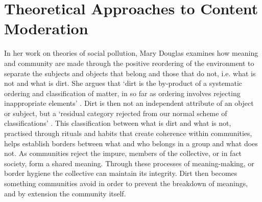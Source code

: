 {\color{red}

\cite{Harway:1988,Gitelman:2013,Gitelman-Jackson:2013,Mohanty:1984}

\section{Theoretical Approaches to Content Moderation} %

In her work on theories of social pollution, Mary Douglas \citeyear{Douglas:1966} examines how meaning and community are made through the positive reordering of the environment to separate the subjects and objects that belong and those that do not, i.e. what is not and what is dirt. She argues that `dirt is the by-product of a systematic ordering and classification of matter, in so far as ordering involves rejecting inappropriate elements' \cite{Douglas:1966}. Dirt is then not an independent attribute of an object or subject, but a `residual category rejected from our normal scheme of classifications' \cite{Douglas:1966}. This classification between what is dirt and what is not, practised through rituals and habits that create coherence within communities, helps establish borders between what and who belongs in a group and what does not. As communities reject the impure, members of the collective, or in fact society, form a shared meaning. Through these processes of meaning-making, or border hygiene the collective can maintain its integrity. Dirt then becomes something communities avoid in order to prevent the breakdown of meanings, and by extension the community itself.

}
